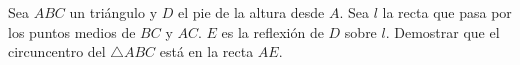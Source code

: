 Sea $ABC$ un triángulo y $D$ el pie de la altura desde $A$. Sea $l$ la recta que pasa por los puntos medios de $BC$ y $AC$. $E$ es la reflexión de $D$ sobre $l$. Demostrar que el circuncentro del $\triangle ABC$ está en la recta $AE$.

